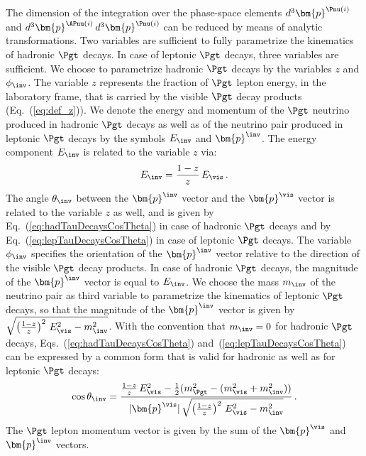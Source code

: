 The dimension of the integration over the phase-space elements
$d^{3}\bm{p}^{\Pnu(i)}$ and $d^{3}\bm{p}^{\APnu(i)} \, d^{3}\bm{p}^{\Pnu(i)}$
can be reduced by means of analytic transformations.
Two variables are sufficient to fully parametrize the kinematics of hadronic $\Pgt$ decays.
In case of leptonic $\Pgt$ decays, three variables are sufficient.
We choose to parametrize hadronic $\Pgt$ decays by the variables $z$ and $\phi_{\inv}$.
The variable $z$ represents the fraction of $\Pgt$ lepton energy, in the laboratory frame,
that is carried by the visible $\Pgt$ decay products (\cf Eq.~(\ref{eq:def_z})).
We denote the energy and momentum of the $\Pgt$ neutrino
produced in hadronic $\Pgt$ decays as well as of the neutrino pair produced in leptonic $\Pgt$
decays by the symbols $E_{\inv}$ and $\bm{p}^{\inv}$.
The energy component $E_{\inv}$ is related to the variable $z$ via:
\begin{equation}
E_{\inv} = \frac{1 - z}{z} \, E_{\vis} \, .
\label{eq:E_inv}
\end{equation}
The angle $\theta_{\inv}$ between the $\bm{p}^{\inv}$ vector and the $\bm{p}^{\vis}$ vector
is related to the variable $z$ as well, 
and is given by Eq.~(\ref{eq:hadTauDecaysCosTheta}) in case of hadronic $\Pgt$ decays 
and by Eq.~(\ref{eq:lepTauDecaysCosTheta}) in case of leptonic $\Pgt$ decays.
The variable $\phi_{\inv}$ specifies the orientation of the
$\bm{p}^{\inv}$ vector relative to the direction of the visible $\Pgt$ decay products.
In case of hadronic $\Pgt$ decays, the magnitude of the $\bm{p}^{\inv}$ vector is equal to $E_{\inv}$.
We choose the mass $m_{\inv}$ of the neutrino pair as third variable to parametrize the kinematics of leptonic $\Pgt$ decays,
so that the magnitude of the $\bm{p}^{\inv}$ vector is given by $\sqrt{\left( \frac{1 - z}{z} \right)^{2} \, E^{2}_{\vis} - m^{2}_{\inv}}$.
With the convention that $m_{\inv} = 0$ for hadronic $\Pgt$ decays,
Eqs.~(\ref{eq:hadTauDecaysCosTheta})
and~(\ref{eq:lepTauDecaysCosTheta}) can be expressed by a common form
that is valid for hadronic as well as for leptonic $\Pgt$ decays:
\begin{equation}
\cos\theta_{\inv} = \frac{\frac{1 - z}{z} \, E^{2}_{\vis} - \frac{1}{2}(m^{2}_{\Pgt} - (m^{2}_{\vis} + m^{2}_{\inv}))}{\vert\bm{p}^{\vis}\vert \, 
  \sqrt{\left( \frac{1 - z}{z} \right)^{2} \, E^{2}_{\vis} - m^{2}_{\inv}}} \, .
\label{eq:theta_inv}
\end{equation}
The $\Pgt$ lepton momentum vector is given by the sum of the
$\bm{p}^{\vis}$ and $\bm{p}^{\inv}$ vectors.

